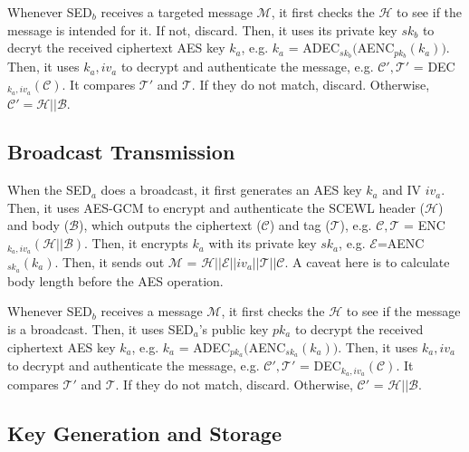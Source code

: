 \documentclass[11pt,oneside,onecolumn,letterpaper]{article}
\begin{document}
Whenever SED$_b$ receives a targeted message $\mathcal{M}$, it first checks the $\mathcal{H}$ to see if the message is intended for it. If not, discard.
Then, it uses its private key $sk_b$ to decryt the received ciphertext AES key $k_a$, e.g. $k_a$ = ADEC$_{sk_b}($AENC$_{pk_b}(k_a))$.
Then, it uses $k_a, iv_a$ to decrypt and authenticate the message, e.g. $\mathcal{C'}, \mathcal{T'}$ = DEC$_{k_a, iv_a}(\mathcal{C})$.
It compares $\mathcal{T'}$ and $\mathcal{T}$.
If they do not match, discard.
Otherwise, $\mathcal{C'}=\mathcal{H}||\mathcal{B}$.

\subsection{Broadcast Transmission}

When the SED$_a$ does a broadcast, it first generates an AES key $k_a$ and IV $iv_a$. 
Then, it uses AES-GCM to encrypt and authenticate the SCEWL header ($\mathcal{H}$) and body ($\mathcal{B}$), which outputs the ciphertext ($\mathcal{C}$) and tag ($\mathcal{T}$), e.g. $\mathcal{C}, \mathcal{T}$ = ENC$_{k_a, iv_a}(\mathcal{H} || \mathcal{B})$.
Then, it encrypts $k_a$ with its private key $sk_a$, e.g. $\mathcal{E}$=AENC$_{sk_a}(k_a)$.
Then, it sends out $\mathcal{M}$ = $\mathcal{H} || \mathcal{E}||iv_a||\mathcal{T}||\mathcal{C}$.
A caveat here is to calculate body length before the AES operation.

Whenever SED$_b$ receives a message $\mathcal{M}$, it first checks the $\mathcal{H}$ to see if the message is a broadcast.
Then, it uses SED$_a$'s public key $pk_a$ to decrypt the received ciphertext AES key $k_a$, e.g. $k_a$ = ADEC$_{pk_a}($AENC$_{sk_a}(k_a))$.
Then, it uses $k_a, iv_a$ to decrypt and authenticate the message, e.g. $\mathcal{C'}, \mathcal{T'}$ = DEC$_{k_a, iv_a}(\mathcal{C})$.
It compares $\mathcal{T'}$ and $\mathcal{T}$.
If they do not match, discard.
Otherwise, $\mathcal{C'}$ = $\mathcal{H}||\mathcal{B}$.

\subsection{Key Generation and Storage}
\end{document}
